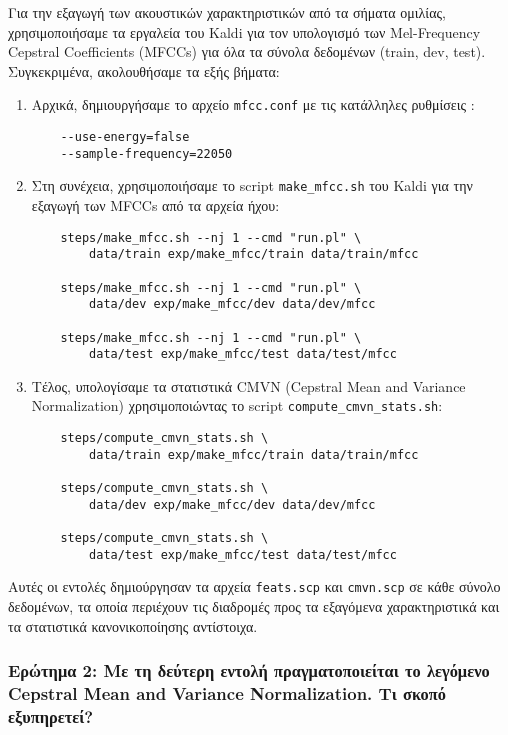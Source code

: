 \documentclass[a4paper,12pt]{article}
\begin{document}
Για την εξαγωγή των ακουστικών χαρακτηριστικών από τα σήματα ομιλίας, χρησιμοποιήσαμε τα εργαλεία του Kaldi για τον υπολογισμό των Mel-Frequency Cepstral Coefficients (MFCCs) για όλα τα σύνολα δεδομένων (train, dev, test). Συγκεκριμένα, ακολουθήσαμε τα εξής βήματα:

\begin{enumerate}
    \item Αρχικά, δημιουργήσαμε το αρχείο \verb|mfcc.conf| με τις κατάλληλες ρυθμίσεις \cite{slp_ntua_mfcc}:
    \begin{lstlisting}
    --use-energy=false
    --sample-frequency=22050
    \end{lstlisting}
    
    \item Στη συνέχεια, χρησιμοποιήσαμε το script \verb|make_mfcc.sh| του Kaldi για την εξαγωγή των MFCCs από τα αρχεία ήχου:
    \begin{lstlisting}
    steps/make_mfcc.sh --nj 1 --cmd "run.pl" \
        data/train exp/make_mfcc/train data/train/mfcc
        
    steps/make_mfcc.sh --nj 1 --cmd "run.pl" \
        data/dev exp/make_mfcc/dev data/dev/mfcc
        
    steps/make_mfcc.sh --nj 1 --cmd "run.pl" \
        data/test exp/make_mfcc/test data/test/mfcc
    \end{lstlisting}
    
    \item Τέλος, υπολογίσαμε τα στατιστικά CMVN (Cepstral Mean and Variance Normalization) χρησιμοποιώντας το script \verb|compute_cmvn_stats.sh|:
    \begin{lstlisting}
    steps/compute_cmvn_stats.sh \
        data/train exp/make_mfcc/train data/train/mfcc
        
    steps/compute_cmvn_stats.sh \
        data/dev exp/make_mfcc/dev data/dev/mfcc
        
    steps/compute_cmvn_stats.sh \
        data/test exp/make_mfcc/test data/test/mfcc
    \end{lstlisting}
\end{enumerate}

Αυτές οι εντολές δημιούργησαν τα αρχεία \verb|feats.scp| και \verb|cmvn.scp| σε κάθε σύνολο δεδομένων, τα οποία περιέχουν τις διαδρομές προς τα εξαγόμενα χαρακτηριστικά και τα στατιστικά κανονικοποίησης αντίστοιχα.

\subsubsection*{Ερώτημα 2: Με τη δεύτερη εντολή πραγματοποιείται το λεγόμενο Cepstral Mean and Variance Normalization. Τι σκοπό εξυπηρετεί?}
\end{document}
